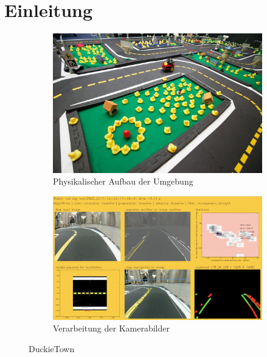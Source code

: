 \chapter{Einleitung}

\begin{figure}[H]
	\centering
	\begin{subfigure}[b]{0.45\textwidth}
		\centering
		\includegraphics[width=\textwidth]{kapitel1/images/duckietown.png}
		\caption*{Physikalischer Aufbau der Umgebung\footnotemark}
		\label{fig:duckietown}
	\end{subfigure}
	\begin{subfigure}[b]{0.505\textwidth}
		\centering
		\includegraphics[width=\textwidth]{kapitel1/images/duckietown2.png}
		\caption*{Verarbeitung der Kamerabilder\footnotemark}
		\label{fig:duckietown2}
	\end{subfigure}
	\caption{DuckieTown}
\end{figure}

